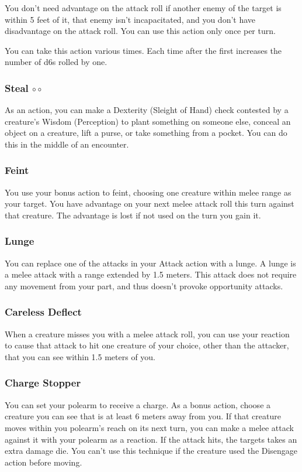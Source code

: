     You don't need advantage on the attack roll if another enemy of the target is within 5 feet of it, that enemy isn't incapacitated, and you don't have disadvantage on the attack roll.
    You can use this action only once per turn.

    You can take this action various times.
    Each time after the first increases the number of d6s rolled by one.

\subsubsection{Steal $\circ\circ$} \label{act::steal}
    As an action, you can make a Dexterity (Sleight of Hand) check contested by a creature's Wisdom (Perception) to plant something on someone else, conceal an object on a creature, lift a purse, or take something from a pocket.
    You can do this in the middle of an encounter.

\subsubsection{Feint} \label{tec::feint}
You use your bonus action to feint, choosing one creature within melee range as your target.
You have advantage on your next melee attack roll this turn against that creature.
The advantage is lost if not used on the turn you gain it.

\subsubsection{Lunge} \label{tec::lunge}
You can replace one of the attacks in your Attack action with a lunge.
A lunge is a melee attack with a range extended by 1.5 meters.
This attack does not require any movement from your part, and thus doesn't provoke opportunity attacks.

\subsubsection{Careless Deflect} \label{tec::carelessdeflect}
When a creature misses you with a melee attack roll, you can use your reaction to cause that attack to hit one creature of your choice, other than the attacker, that you can see within 1.5 meters of you.

\subsubsection{Charge Stopper} \label{tec::chargestopper}
You can set your polearm to receive a charge.
As a bonus action, choose a creature you can see that is at least 6 meters away from you.
If that creature moves within you polearm's reach on its next turn, you can make a melee attack against it with your polearm as a reaction.
If the attack hits, the targets takes an extra damage die.
You can't use this technique if the creature used the Disengage action before moving.

